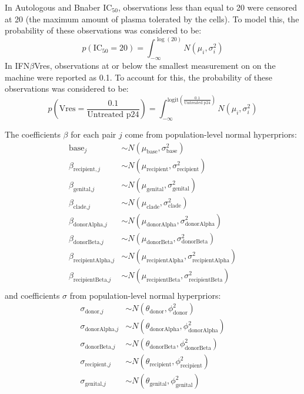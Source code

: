 \documentclass[12pt]{article}
\newcommand{\ifnb}{IFN${\beta}$}
\newcommand{\icFifty}{IC$_{50}$}
\begin{document}
In Autologous and Bnaber \icFifty{}, observations less than equal to 20 were censored at 20 (the maximum amount of plasma tolerated by the cells). To model this, the probability of these observations was considered to be:
\[p(\text{\icFifty}=20)=\int_{-\infty}^{\log(20)}N(\mu_i,\sigma^2_i)\]
In \ifnb Vres, observations at or below the smallest measurement on on the machine were reported as 0.1. To account for this, the probability of these observations was considered to be:
\[p\left(\text{Vres}=\frac{0.1}{\text{Untreated p24}}\right)=\int_{-\infty}^{\text{logit}\left(\frac{0.1}{\text{Untreated p24}}\right)}N(\mu_i,\sigma^2_i)\]

The coefficients $\beta$ for each pair $j$ come from population-level normal hyperpriors:
\begin{align*}
\text{base}_{j} & \sim  N(\mu_{\text{base}},\sigma^2_{\text{base}})\\
\beta_{\text{recipient},j} & \sim  N(\mu_{\text{recipient}},\sigma^2_{\text{recipient}})\\
\beta_{\text{genital,}j} & \sim  N(\mu_{\text{genital}},\sigma^2_{\text{genital}})\\
\beta_{\text{clade,}j} & \sim  N(\mu_{\text{clade}},\sigma^2_{\text{clade}}) \\
\beta_{\text{donorAlpha,}j} & \sim  N(\mu_{\text{donorAlpha}},\sigma^2_{\text{donorAlpha}}) \\
\beta_{\text{donorBeta,}j} & \sim  N(\mu_{\text{donorBeta}},\sigma^2_{\text{donorBeta}}) \\
\beta_{\text{recipientAlpha,}j} & \sim  N(\mu_{\text{recipientAlpha}},\sigma^2_{\text{recipientAlpha}}) \\
\beta_{\text{recipientBeta,}j} & \sim  N(\mu_{\text{recipientBeta}},\sigma^2_{\text{recipientBeta}}) \\
\end{align*}
and coefficients $\sigma$ from population-level normal hyperpriors:
\begin{align*}
\sigma_{\text{donor,}j} & \sim  N(\theta_\text{donor},\phi^2_\text{donor})\\
\sigma_{\text{donorAlpha,}j} & \sim  N(\theta_\text{donorAlpha},\phi^2_\text{donorAlpha})\\
\sigma_{\text{donorBeta,}j} & \sim  N(\theta_\text{donorBeta},\phi^2_\text{donorBeta})\\
\sigma_{\text{recipient,}j} & \sim  N(\theta_\text{recipient},\phi^2_\text{recipient})\\
\sigma_{\text{genital,}j} & \sim  N(\theta_\text{genital},\phi^2_\text{genital})\\
\end{align*}
\end{document}
